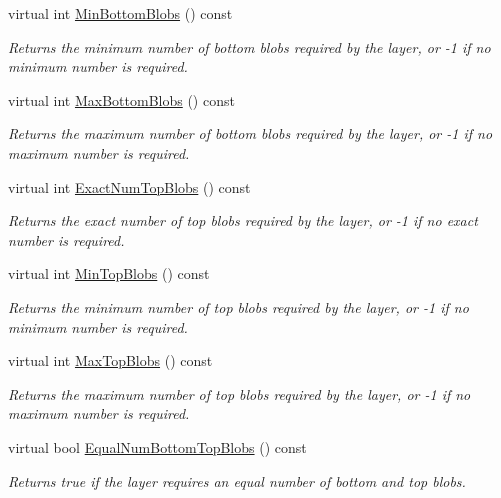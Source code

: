 \begin{DoxyCompactItemize}
virtual int \mbox{\hyperlink{classcaffe_1_1_layer_aca3cb2bafaefda5d4760aaebd0b72def}{Min\+Bottom\+Blobs}} () const
\begin{DoxyCompactList}\small\item\em Returns the minimum number of bottom blobs required by the layer, or -\/1 if no minimum number is required. \end{DoxyCompactList}\item 
virtual int \mbox{\hyperlink{classcaffe_1_1_layer_af8bdc989053e0363ab032026b46de7c3}{Max\+Bottom\+Blobs}} () const
\begin{DoxyCompactList}\small\item\em Returns the maximum number of bottom blobs required by the layer, or -\/1 if no maximum number is required. \end{DoxyCompactList}\item 
virtual int \mbox{\hyperlink{classcaffe_1_1_layer_a64e2ca72c719e4b2f1f9216ccfb0d37f}{Exact\+Num\+Top\+Blobs}} () const
\begin{DoxyCompactList}\small\item\em Returns the exact number of top blobs required by the layer, or -\/1 if no exact number is required. \end{DoxyCompactList}\item 
virtual int \mbox{\hyperlink{classcaffe_1_1_layer_ab9e4c8d642e413948b131d851a8462a4}{Min\+Top\+Blobs}} () const
\begin{DoxyCompactList}\small\item\em Returns the minimum number of top blobs required by the layer, or -\/1 if no minimum number is required. \end{DoxyCompactList}\item 
virtual int \mbox{\hyperlink{classcaffe_1_1_layer_ac6c03df0b6e40e776c94001e19994a2e}{Max\+Top\+Blobs}} () const
\begin{DoxyCompactList}\small\item\em Returns the maximum number of top blobs required by the layer, or -\/1 if no maximum number is required. \end{DoxyCompactList}\item 
virtual bool \mbox{\hyperlink{classcaffe_1_1_layer_af452a938bc7596f9b5e9900c8dc4ab3d}{Equal\+Num\+Bottom\+Top\+Blobs}} () const
\begin{DoxyCompactList}\small\item\em Returns true if the layer requires an equal number of bottom and top blobs. \end{DoxyCompactList}\item 

\end{DoxyCompactItemize}
